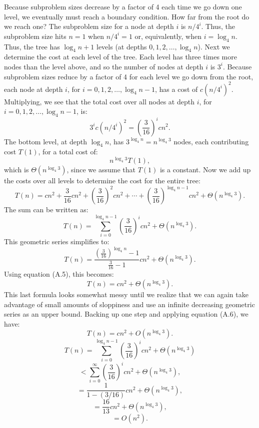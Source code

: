 \documentclass{report}
\begin{document}
        \bigbreak \noindent 
        \bigbreak \noindent 
        Because subproblem sizes decrease by a factor of 4 each time we go down one level, we eventually must reach a boundary condition. How far from the root do we reach one? The subproblem size for a node at depth \( i \) is \( n / 4^i \). Thus, the subproblem size hits \( n = 1 \) when \( n / 4^i = 1 \) or, equivalently, when \( i = \log_4 n \). Thus, the tree has \( \log_4 n + 1 \) levels (at depths \( 0, 1, 2, \ldots, \log_4 n \)).
        \bigbreak \noindent 
        Next we determine the cost at each level of the tree. Each level has three times more nodes than the level above, and so the number of nodes at depth \( i \) is \( 3^i \). Because subproblem sizes reduce by a factor of 4 for each level we go down from the root, each node at depth \( i \), for \( i = 0, 1, 2, \ldots, \log_4 n - 1 \), has a cost of \( c(n/4^i)^2 \). Multiplying, we see that the total cost over all nodes at depth \( i \), for \( i = 0, 1, 2, \ldots, \log_4 n - 1 \), is:
        \[
            3^i c(n/4^i)^2 = \left(\frac{3}{16}\right)^i c n^2.
        \]
        The bottom level, at depth \( \log_4 n \), has \( 3^{\log_4 n} = n^{\log_4 3} \) nodes, each contributing cost \( T(1) \), for a total cost of:
        \[
            n^{\log_4 3} T(1),
        \]
        which is \( \Theta(n^{\log_4 3}) \), since we assume that \( T(1) \) is a constant.
        \bigbreak \noindent 
        Now we add up the costs over all levels to determine the cost for the entire tree:
        \[
            T(n) = cn^2 + \frac{3}{16} cn^2 + \left(\frac{3}{16}\right)^2 cn^2 + \cdots + \left(\frac{3}{16}\right)^{\log_4 n - 1} cn^2 + \Theta(n^{\log_4 3}).
        \]
        The sum can be written as:
        \[
            T(n) = \sum_{i=0}^{\log_4 n - 1} \left(\frac{3}{16}\right)^i cn^2 + \Theta(n^{\log_4 3}).
        \]
        This geometric series simplifies to:
        \[
            T(n) = \frac{\left(\frac{3}{16}\right)^{\log_4 n} - 1}{\frac{3}{16} - 1} cn^2 + \Theta(n^{\log_4 3}).
        \]
        Using equation (A.5), this becomes:
        \[
            T(n) = cn^2 + \Theta(n^{\log_4 3}).
        \]
        This last formula looks somewhat messy until we realize that we can again take advantage of small amounts of sloppiness and use an infinite decreasing geometric series as an upper bound. Backing up one step and applying equation (A.6), we have:
        \[
            T(n) = cn^2 + O(n^{\log_4 3}).
        \]
        \[
            T(n) = \sum_{i=0}^{\log_4 n - 1} \left(\frac{3}{16}\right)^i c n^2 + \Theta(n^{\log_4 3})
        \]
        \[
            < \sum_{i=0}^\infty \left(\frac{3}{16}\right)^i c n^2 + \Theta(n^{\log_4 3}),
        \]
        \[
            = \frac{1}{1 - (3/16)} c n^2 + \Theta(n^{\log_4 3}),
        \]
        \[
            = \frac{16}{13} c n^2 + \Theta(n^{\log_4 3}),
        \]
        \[
            = O(n^2).
        \]
\end{document}
